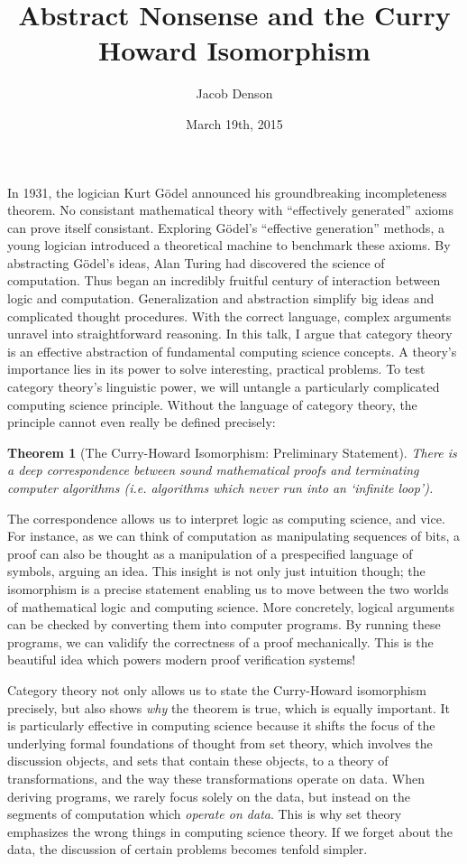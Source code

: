 \documentclass{article}
\title{Abstract Nonsense and the Curry Howard Isomorphism}
\author{Jacob Denson}
\date{March 19th, 2015}
\theoremstyle{plain}
\newtheorem{theorem}{Theorem}
\begin{document}
\maketitle

In 1931, the logician Kurt G\"{o}del announced his groundbreaking incompleteness theorem. No consistant mathematical theory with ``effectively generated'' axioms can prove itself consistant. Exploring G\"{o}del's  ``effective generation'' methods, a young logician introduced a theoretical machine to benchmark these axioms. By abstracting G\"{o}del's ideas, Alan Turing had discovered the science of computation. Thus began an incredibly fruitful century of interaction between logic and computation. Generalization and abstraction simplify big ideas and complicated thought procedures. With the correct language, complex arguments unravel into straightforward reasoning. In this talk, I argue that category theory is an effective abstraction of fundamental computing science concepts. A theory's importance lies in its power to solve interesting, practical problems. To test category theory's linguistic power, we will untangle a particularly complicated computing science principle. Without the language of category theory, the principle cannot even really be defined precisely:

\begin{theorem}[The Curry-Howard Isomorphism: Preliminary Statement]
    There is a deep correspondence between sound mathematical proofs and terminating computer algorithms (i.e. algorithms which never run into an `infinite loop').
\end{theorem}

The correspondence allows us to interpret logic as computing science, and vice. For instance, as we can think of computation as manipulating sequences of bits, a proof can also be thought as a manipulation of a prespecified language of symbols, arguing an idea. This insight is not only just intuition though; the isomorphism is a precise statement enabling us to move between the two worlds of mathematical logic and computing science. More concretely, logical arguments can be checked by converting them into computer programs. By running these programs, we can validify the correctness of a proof mechanically. This is the beautiful idea which powers modern proof verification systems!

Category theory not only allows us to state the Curry-Howard isomorphism precisely, but also shows {\it why} the theorem is true, which is equally important. It is particularly effective in computing science because it shifts the focus of the underlying formal foundations of thought from set theory, which involves the discussion objects, and sets that contain these objects, to a theory of transformations, and the way these transformations operate on data. When deriving programs, we rarely focus solely on the data, but instead on the segments of computation which {\it operate on data}. This is why set theory emphasizes the wrong things in computing science theory. If we forget about the data, the discussion of certain problems becomes tenfold simpler.
\end{document}
